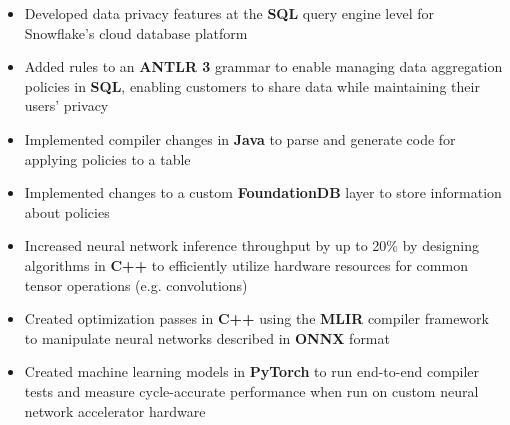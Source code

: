\documentclass{moderncv}
\begin{document}
{\begin{itemize}
    \item Developed data privacy features at the \textbf{SQL} query engine level for Snowflake's cloud database platform
    \item Added rules to an \textbf{ANTLR 3} grammar to enable managing data aggregation policies in \textbf{SQL}, enabling customers to share data while maintaining their users' privacy
    \item Implemented compiler changes in \textbf{Java} to parse and generate code for applying policies to a table
    \item Implemented changes to a custom \textbf{FoundationDB} layer to store information about policies
\end{itemize}}

\begin{comment}
Snowflake1: Aggregation Policy Parser Stuff
basically, added a new type of policy which is an SQL object
it had to be added to the parser through an ANTLR grammar
but there was an issue with the way the grammar was factored into sub-grammars
so I had to inspect generated code and eventually refactor the root rules
into subrules in separate files
    rootparser.g:
        rule -> rule1 | rule2 | rule3;
    rules1.g:
        rule1 -> [...]
        rule2 -> [...]
    rules2.g:
        rule3 -> [...]
became
    rootparser.g:
        rule -> rules1 | rules2
    rules1.g:
        rules1 -> rule1 | rule2
        rule1 -> [...]
        rule2 -> [...]
    rules2.g:
        rule3 -> [...]
and then i was able to implement the rules for that type of policy
\end{comment}

{\begin{itemize}
    \item Increased neural network inference throughput by up to 20\% by designing algorithms in \textbf{C++} to efficiently utilize hardware resources for common tensor operations (e.g. convolutions)
    \item Created optimization passes in \textbf{C++} using the \textbf{MLIR} compiler framework to manipulate neural networks described in \textbf{ONNX} format
    \item Created machine learning models in \textbf{PyTorch} to run end-to-end compiler tests and measure cycle-accurate performance when run on custom neural network accelerator hardware
\end{itemize}}
\end{document}
